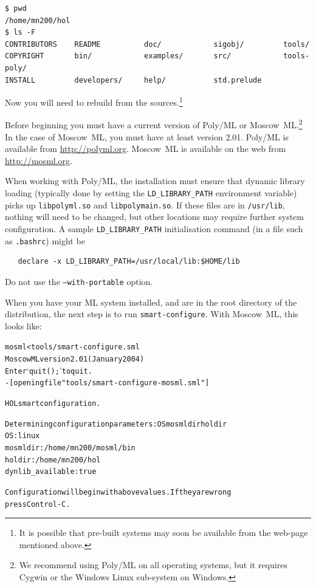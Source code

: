 \setcounter{sessioncount}{0}
\begin{session}
\begin{verbatim}
$ pwd
/home/mn200/hol
$ ls -F
CONTRIBUTORS    README          doc/            sigobj/         tools/
COPYRIGHT       bin/            examples/       src/            tools-poly/
INSTALL         developers/     help/           std.prelude
\end{verbatim}
\end{session}

Now you will need to rebuild \HOL{} from the sources.\footnote{It is
  possible that pre-built systems may soon be available from the
  web-page mentioned above.}

Before beginning you must have a current version of Poly/ML or Moscow~ML.\footnote{We recommend using Poly/ML on all operating systems, but it requires Cygwin or the Windows Linux sub-system on Windows.}
In the case of Moscow~ML, you must have at least version 2.01.
Poly/ML is available from \url{http://polyml.org}.
Moscow~ML is available on the web from \url{http://mosml.org}.

When working with Poly/ML, the installation must ensure that dynamic library loading (typically done by setting the \texttt{LD\_LIBRARY\_PATH} environment variable) picks up \texttt{libpolyml.so} and \texttt{libpolymain.so}.
If these files are in \texttt{/usr/lib}, nothing will need to be changed, but other locations may require further system configuration.
A sample \texttt{LD\_LIBRARY\_PATH} initialisation command (in a file such as \texttt{.bashrc}) might be
\begin{verbatim}
   declare -x LD_LIBRARY_PATH=/usr/local/lib:$HOME/lib
\end{verbatim}
Do not use the \texttt{--with-portable} option.

When you have your ML system installed, and are in the root directory of the distribution, the next step is to run \texttt{smart-configure}.
With Moscow~ML, this looks like:

\begin{session}
\begin{alltt}
\dol mosml < tools/smart-configure.sml
Moscow ML version 2.01 (January 2004)
Enter `quit();' to quit.
- [opening file "tools/smart-configure-mosml.sml"]

HOL smart configuration.

Determining configuration parameters: OS mosmldir holdir
OS:                 linux
mosmldir:           /home/mn200/mosml/bin
holdir:             /home/mn200/hol
dynlib_available:   true

Configuration will begin with above values.  If they are wrong
press Control-C.
\end{alltt}
\end{session}

